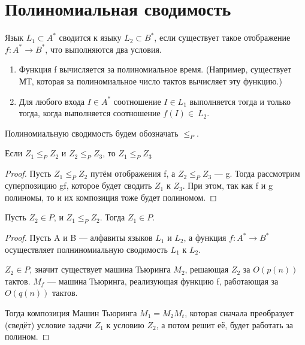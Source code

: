 \section{Полиномиальная сводимость}

\begin{definition}
	Язык $L_1 \subset A^*$ сводится к языку $ L_2 \subset B^*$, если
	существует такое отображение $f: A^* \to B^*$, что выполняются два
	условия.
	\begin{enumerate}
		\item Функция f вычисляется за полиномиальное время. (Например,
			существует МТ, которая за полиномиальное число тактов
			вычисляет эту функцию.)
		\item Для любого входа $I\in A^*$ соотношение $I\in L_1$
			выполняется тогда и только тогда, когда выполняется
			соотношение  $f(I)\in~L_2.$
	\end{enumerate}
\end{definition}


Полиномиальную сводимость будем обозначать $\le_P$.


\begin{lemma}
	Если $Z_1 \le_P Z_2$ и  $Z_2 \le_P Z_3$, то $Z_1 \le_P Z_3$
\end{lemma}
\begin{proof}
	Пусть $Z_1 \le_P Z_2$ путём отображения f, а  $Z_2 \le_P Z_3$ --- g.
	Тогда рассмотрим суперпозицию gf, которое будет сводить $Z_1$ к  $Z_3$.
	При этом, так как f и g полиномы, то и их композиция тоже будет
	полиномом.
\end{proof}
\begin{lemma}
	Пусть $Z_2 \in P$, и  $Z_1 \le_P Z_2$. Тогда  $Z_1 \in P$.
\end{lemma}
\begin{proof}
	Пусть A и B --- алфавиты языков $L_1$ и $L_2$, а функция $f: A^* \to
	B^*$ осуществляет полниномиальную сводимость $L_1$ к $L_2$.

	$Z_2\in P$, значит существует машина Тьюринга $M_2$, решающая  $Z_2$ за
	$O(p(n))$ тактов.
	$M_f$ --- машина Тьюринга, реализующая функцию f, работающая за
	$O(q(n))$ тактов.
	
	Тогда композиция Машин Тьюринга $M_1 = M_2M_t$, которая сначала
	преобразует (сведёт) условие задачи $Z_1$ к условию $Z_2$, а потом решит
	её, будет работать за полином.

\end{proof}

